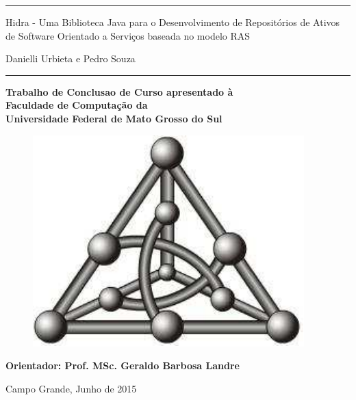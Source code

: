 
\begin{center}
\noindent \rule{\linewidth}{.1cm}

\vspace*{1cm}

{\LARGE \textsf{Hidra - Uma Biblioteca Java para o Desenvolvimento de Repositórios de Ativos de Software Orientado a Serviços baseada no modelo RAS}}

\vspace*{1cm}

{\Large \textsf{Danielli Urbieta e Pedro Souza}}

\vspace*{1cm}

\noindent \rule{\linewidth}{.1cm}

\vspace*{1cm}

{\large

\textbf{Trabalho de Conclusao de Curso apresentado à} \\
\textbf{Faculdade de Computa\c{c}\~{a}o da} \\
\textbf{Universidade Federal de Mato Grosso do Sul}

}

\vspace*{1cm}

\begin{figure}[htb]
\begin{center}
\includegraphics{images/grafo}
\end{center}
\end{figure}
\vspace{2 cm}

\textbf{Orientador: Prof. MSc. Geraldo Barbosa Landre}


Campo Grande, Junho de 2015

\end{center}
